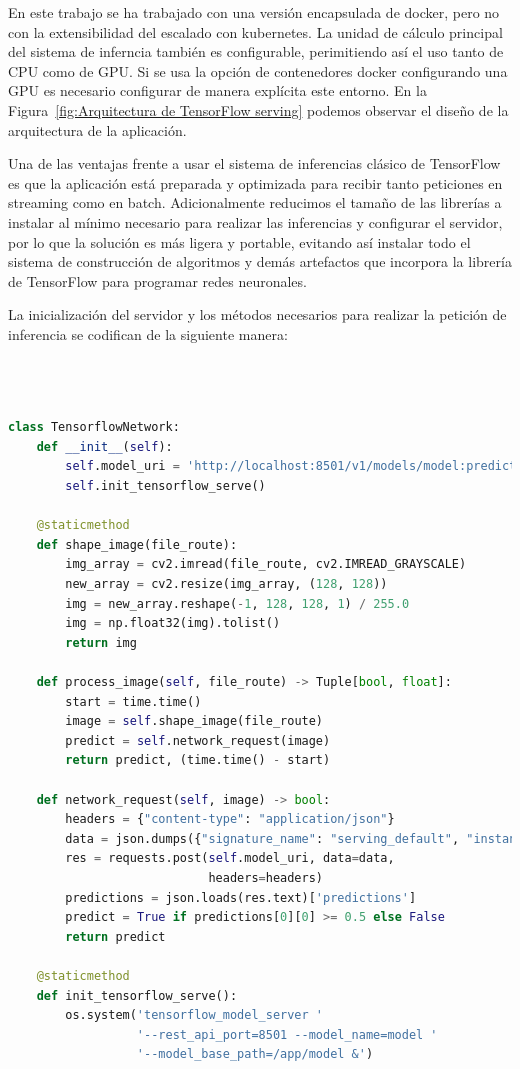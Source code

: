 En este trabajo se ha trabajado con una versión encapsulada de docker, pero no con la extensibilidad del escalado con kubernetes.
La unidad de cálculo principal del sistema de inferncia también es configurable, perimitiendo así el uso tanto de CPU como de GPU.
Si se usa la opción de contenedores docker configurando una GPU es necesario configurar de manera explícita este entorno.
En la Figura~\ref{fig:Arquitectura de TensorFlow serving} podemos observar el diseño de la arquitectura de la aplicación.

Una de las ventajas frente a usar el sistema de inferencias clásico de TensorFlow es que la aplicación está preparada y optimizada para recibir tanto peticiones en streaming como en batch.
Adicionalmente reducimos el tamaño de las librerías a instalar al mínimo necesario para realizar las inferencias y configurar el servidor, por lo que la solución es más ligera y portable, evitando así
instalar todo el sistema de construcción de algoritmos y demás artefactos que incorpora la librería de TensorFlow para programar redes neuronales.

La inicialización del servidor y los métodos necesarios para realizar la petición de inferencia se codifican de la siguiente manera:

\begin{lstlisting}[caption=Clase de TensorFlow de la aplicación del trabajo.,
  label=a_label,
  language=python]



class TensorflowNetwork:
    def __init__(self):
        self.model_uri = 'http://localhost:8501/v1/models/model:predict'
        self.init_tensorflow_serve()

    @staticmethod
    def shape_image(file_route):
        img_array = cv2.imread(file_route, cv2.IMREAD_GRAYSCALE)
        new_array = cv2.resize(img_array, (128, 128))
        img = new_array.reshape(-1, 128, 128, 1) / 255.0
        img = np.float32(img).tolist()
        return img

    def process_image(self, file_route) -> Tuple[bool, float]:
        start = time.time()
        image = self.shape_image(file_route)
        predict = self.network_request(image)
        return predict, (time.time() - start)

    def network_request(self, image) -> bool:
        headers = {"content-type": "application/json"}
        data = json.dumps({"signature_name": "serving_default", "instances": image})
        res = requests.post(self.model_uri, data=data,
                            headers=headers)
        predictions = json.loads(res.text)['predictions']
        predict = True if predictions[0][0] >= 0.5 else False
        return predict

    @staticmethod
    def init_tensorflow_serve():
        os.system('tensorflow_model_server '
                  '--rest_api_port=8501 --model_name=model '
                  '--model_base_path=/app/model &')
\end{lstlisting}


